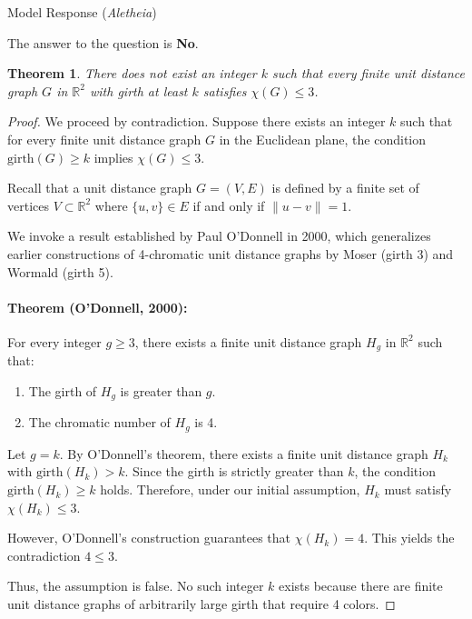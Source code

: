 \documentclass[11pt]{article}
\newtheorem{theorem}{Theorem}
\begin{document}
\begin{solution}{Model Response (\emph{Aletheia})}

\noindent The answer to the question is \textbf{No}.

\begin{theorem}
There does not exist an integer $k$ such that every finite unit distance graph $G$ in $\mathbb{R}^2$ with girth at least $k$ satisfies $\chi(G) \leq 3$.
\end{theorem}

\begin{proof}
We proceed by contradiction. Suppose there exists an integer $k$ such that for every finite unit distance graph $G$ in the Euclidean plane, the condition $\text{girth}(G) \ge k$ implies $\chi(G) \leq 3$.

Recall that a unit distance graph $G = (V, E)$ is defined by a finite set of vertices $V \subset \mathbb{R}^2$ where $\{u, v\} \in E$ if and only if $\|u - v\| = 1$.

We invoke a result established by Paul O'Donnell in 2000, which generalizes earlier constructions of 4-chromatic unit distance graphs by Moser (girth 3) and Wormald (girth 5).

\paragraph{Theorem (O'Donnell, 2000):} For every integer $g \ge 3$, there exists a finite unit distance graph $H_g$ in $\mathbb{R}^2$ such that:
\begin{enumerate}
    \item The girth of $H_g$ is greater than $g$.
    \item The chromatic number of $H_g$ is 4.
\end{enumerate}

Let $g = k$. By O'Donnell's theorem, there exists a finite unit distance graph $H_k$ with $\text{girth}(H_k) > k$. Since the girth is strictly greater than $k$, the condition $\text{girth}(H_k) \ge k$ holds. Therefore, under our initial assumption, $H_k$ must satisfy $\chi(H_k) \leq 3$.

However, O'Donnell's construction guarantees that $\chi(H_k) = 4$. This yields the contradiction $4 \leq 3$.

Thus, the assumption is false. No such integer $k$ exists because there are finite unit distance graphs of arbitrarily large girth that require 4 colors.
\end{proof}


\end{solution}
\end{document}
